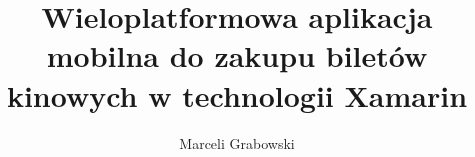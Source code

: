 \documentclass[12pt,a4paper]{report}
\author{Marceli Grabowski}
\title{Wieloplatformowa aplikacja mobilna do zakupu biletów kinowych w technologii Xamarin}
\begin{document}
\nocite{*}



\end{document}
